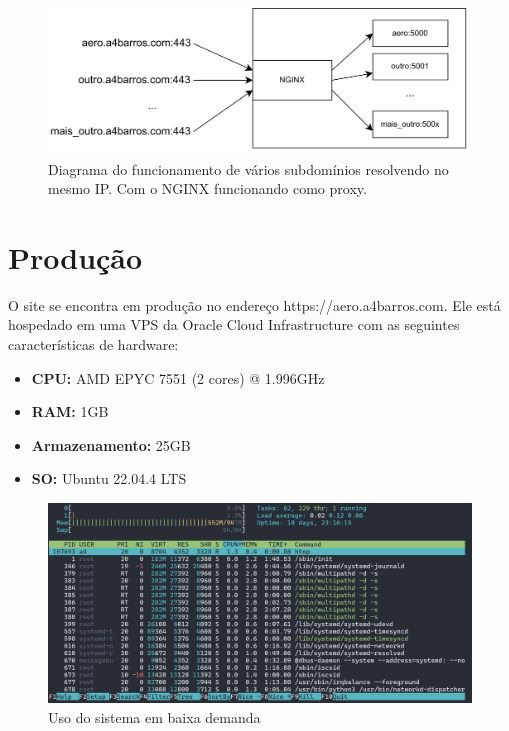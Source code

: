 \begin{figure}[ht]
    \begin{center}
    \includegraphics[width=400pt]{img/arquit.png}
    \caption{Diagrama do funcionamento de vários subdomínios resolvendo no mesmo IP. Com o NGINX funcionando como proxy.}
    \label{fig:sbrf-plot}
    \end{center}
\end{figure}

\section{Produção}
O site se encontra em produção no endereço https://aero.a4barros.com. Ele está hospedado em uma VPS
da Oracle Cloud Infrastructure com as seguintes características de hardware:

\begin{itemize}
    \item \textbf{CPU:} AMD EPYC 7551 (2 cores) @ 1.996GHz
    \item \textbf{RAM:} 1GB
    \item \textbf{Armazenamento:} 25GB
    \item \textbf{SO:} Ubuntu 22.04.4 LTS
\end{itemize}

\begin{figure}[ht]
    \begin{center}
    \includegraphics[width=400pt]{img/prod-idle.png}
    \caption{Uso do sistema em baixa demanda}
    \label{fig:prod-idle}
    \end{center}
\end{figure}

